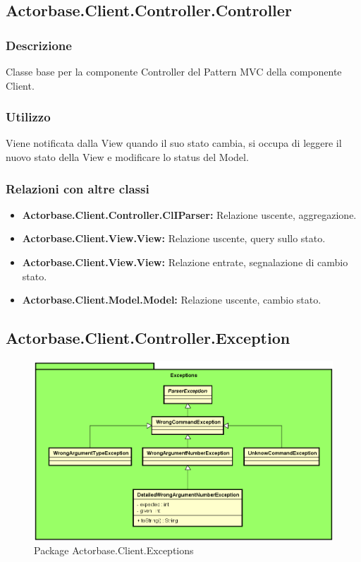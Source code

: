 \documentclass[a4paper]{article}
\begin{document}
				
		\subsection{Actorbase.Client.Controller.Controller}
			\subsubsection{Descrizione}
				Classe base per la componente Controller del Pattern MVC della componente Client.
			\subsubsection{Utilizzo}
				Viene notificata dalla View quando il suo stato cambia, si occupa di leggere il nuovo stato della View e modificare lo status del Model.
			\subsubsection{Relazioni con altre classi}
				\begin{itemize}
					\item \textbf{Actorbase.Client.Controller.ClIParser:} Relazione uscente, aggregazione.
					\item \textbf{Actorbase.Client.View.View:} Relazione uscente, query sullo stato.
					\item \textbf{Actorbase.Client.View.View:} Relazione entrate, segnalazione di cambio stato.
					\item \textbf{Actorbase.Client.Model.Model:} Relazione uscente, cambio stato.
				\end{itemize}
				
		\subsection{Actorbase.Client.Controller.Exception}
			\begin{figure} [H]
				\centering
				\includegraphics[scale=0.6]{ST/Client/ControllerExceptions.png}
   		     	\caption{Package Actorbase.Client.Exceptions}
			\end{figure}
\end{document}
